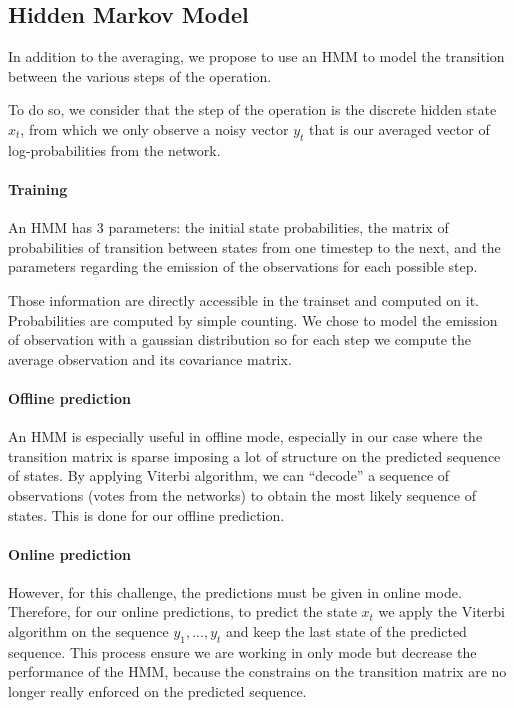 \documentclass[runningheads,a4paper]{llncs}
\begin{document}
\subsection{Hidden Markov Model}

In addition to the averaging, we propose to use an HMM to model the transition
between the various steps of the operation.

To do so, we consider that the step of the operation is the discrete hidden state $x_t$,
from which we only observe a noisy vector $y_t$ that is our averaged vector of log-probabilities from
the network.

\paragraph{Training} An HMM has 3 parameters: the initial state probabilities, the matrix of probabilities
of transition between states from one timestep to the next, and the parameters
regarding the emission of the observations for each possible step.

Those information are directly accessible in the trainset and computed on it.
Probabilities are computed by simple counting. We chose to model the emission of
observation with a gaussian distribution so for each step we compute the average
observation and its covariance matrix.

\paragraph{Offline prediction} An HMM is especially useful in offline mode, especially
in our case where the transition matrix is sparse imposing a lot of structure on
the predicted sequence of states. By applying Viterbi algorithm, we can ``decode''
a sequence of observations (votes from the networks) to obtain the most likely
sequence of states. This is done for our offline prediction.

\paragraph{Online prediction} However, for this challenge, the predictions must
be given in online mode. Therefore, for our online predictions, to predict the state
$x_t$ we apply the Viterbi algorithm on the sequence $y_1,...,y_t$ and keep the
last state of the predicted sequence. This process ensure we are working in only
mode but decrease the performance of the HMM, because the constrains on the transition
matrix are no longer really enforced on the predicted sequence.
\end{document}
